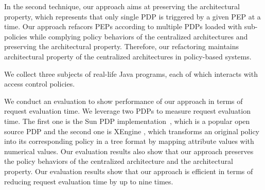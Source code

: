 In the second technique, our approach aims at preserving the architectural property, which represents that only single PDP is triggered by a given PEP at a time.
Our approach refacors PEPs according to multiple PDPs loaded with sub-policies while complying policy behaviors of the centralized architectures 
and preserving the architectural property. \FixJeeHyun{}
Therefore, our refactoring maintains architectural property of the centralized architectures in policy-based systems.
 






We collect three subjects of real-life Java programs, each of which interacts
with access control policies.

 
We conduct an evaluation to show performance of our approach in terms of request evaluation time.
We leverage two PDPs to measure request evaluation time. The first one is the
Sun PDP implementation~\cite{oasis}, which is a popular open source PDP and the second one is 
XEngine \cite{Xengine}, which transforms an original policy
into its corresponding policy in a tree format by mapping attribute values with numerical values.
Our evaluation results also show that our approach
preserves the policy behaviors of the centralized architecture and the architectural property. Our evaluation results show that our approach
is efficient in terms of reducing request evaluation time by up to nine times. 



